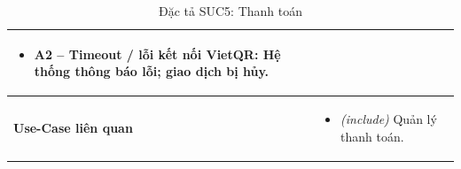 \begin{table}[H]
\begin{tabularx}{\textwidth}{|>{\centering\arraybackslash\bfseries}m{3.5cm}|X|}
\begin{itemize}[leftmargin=*, nosep, label=-]
        \item \textbf{A2 -- Timeout / lỗi kết nối VietQR:} Hệ thống thông báo lỗi; giao dịch bị hủy.
    \end{itemize} \\
    \hline
    Use-Case liên quan &
    \begin{itemize}[leftmargin=*, nosep, label=-]
        \vspace{0.1cm}
        \item \textit{(include)} Quản lý thanh toán.
\end{itemize} \\
    \hline
\end{tabularx}
\caption{Đặc tả SUC5: Thanh toán}
\end{table}



\vspace{1cm}

